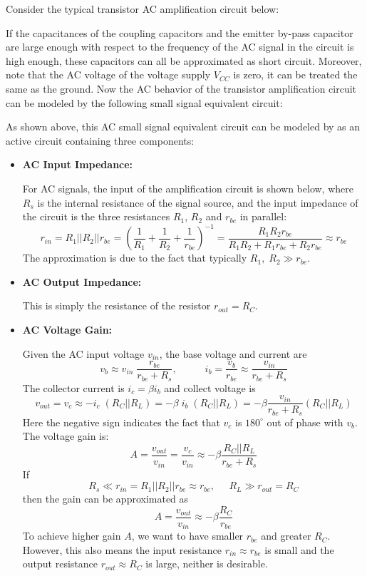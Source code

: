 \begin{itemize}
Consider the typical transistor AC amplification circuit below:


If the capacitances of the coupling capacitors and the emitter by-pass 
capacitor are large enough with respect to the frequency of the AC signal 
in the circuit is high enough, these capacitors can all be approximated as 
short circuit. Moreover, note that the AC voltage of the voltage supply
$V_{CC}$ is zero, it can be treated the same as the ground. Now the AC
behavior of the transistor amplification circuit can be modeled by the 
following small signal equivalent circuit:



As shown above, this AC small signal equivalent circuit can be modeled 
by as an active circuit containing three components:

\begin{itemize}
\item {\bf AC Input Impedance:} 

  For AC signals, the input of the amplification circuit is shown below, 
  where $R_s$ is the internal resistance of the signal source, and the 
  input impedance of the circuit is the three resistances $R_1$, $R_2$ and 
  $r_{be}$ in parallel:
  \[	
  r_{in}=R_1||R_2||r_{be}
  =\left(\frac{1}{R_1}+\frac{1}{R_2}+\frac{1}{r_{be}}\right)^{-1}
  =\frac{R_1 R_2 r_{be}}{R_1R_2+R_1r_{be}+R_2r_{be}}\approx r_{be}	
  \]
  The approximation is due to the fact that typically $R_1,\;R_2\gg r_{be}$.
\item {\bf AC Output Impedance:} 

  This is simply the resistance of the resistor $r_{out}=R_C$.

\item {\bf AC Voltage Gain:} 

  Given the AC input voltage $v_{in}$, the base voltage and current are
  \[
  v_b \approx v_{in}\;\frac{r_{be}}{r_{be}+R_s},\;\;\;\;\;\;\;\;\;\;
  i_b=\frac{v_b}{r_{be}}\approx \frac{v_{in}}{r_{be}+R_s}
  \]
  The collector current is $i_c=\beta i_b$ and collect voltage is
  \[
  v_{out}=v_c\approx -i_c\;(R_C||R_L) = -\beta\;i_b\;(R_C||R_L)	
  =-\beta \frac{v_{in}}{r_{be}+R_s} (R_C||R_L)
  \]
  Here the negative sign indicates the fact that $v_c$ is $180^\circ$ out of
  phase with $v_b$.
  The voltage gain is:
  \[
  A=\frac{v_{out}}{v_{in}}=\frac{v_c}{v_{in}}
  \approx -\beta \frac{R_C||R_L}{r_{be}+R_s}
  \]
  If 
  \[	
  R_s\ll r_{in}=R_1||R_2||r_{be} \approx r_{be},\;\;\;\;\;R_L\gg r_{out}=R_C 
  \]
  then the gain can be approximated as
  \[
  A=\frac{v_{out}}{v_{in}}\approx -\beta \frac{R_C}{r_{be}}	
  \]
  To achieve higher gain $A$, we want to have smaller $r_{be}$ and 
  greater $R_C$. However, this also means the input resistance
  $r_{in}\approx r_{be}$ is small and the output resistance 
  $r_{out}\approx R_C$ is large, neither is desirable.


\end{itemize}
\end{itemize}
